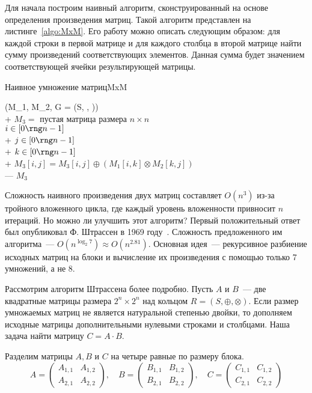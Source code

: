 Для начала построим наивный алгоритм, сконструированный на основе определения произведения матриц.
Такой алгоритм представлен на листинге~\ref{algo:MxM}.
Его работу можно описать следующим образом: для каждой строки в первой матрице и для каждого столбца в второй матрице найти сумму произведений соответствующих элементов.
Данная сумма будет значением соответствующей ячейки результирующей матрицы.

\begin{algorithm}{Наивное умножение матриц}{MxM}
    \begin{pseudo}[]
         (M_1, M_2, G = (S, \oplus, \otimes)) \\+
        $M_3 = $ пустая матрица размера $n \times n$ \\
         $i \in [0 \rng n - 1]$ \\+
         $j \in [0 \rng n - 1]$ \\+
         $k \in [0 \rng n - 1]$ \\+
        $M_3[i, j] = M_3[i, j] \oplus (M_1[i, k] \otimes M_2[k, j])$ \\---
         $M_3$
    \end{pseudo}
\end{algorithm}

Сложность наивного произведения двух матриц составляет $O(n^3)$ из-за тройного вложенного цикла, где каждый уровень вложенности привносит $n$ итераций.
Но можно ли улучшить этот алгоритм?
Первый положительный ответ был опубликовал Ф. Штрассен в 1969 году~.
Сложность предложенного им алгоритма~--- $O(n^{\log_2 7}) \approx O(n^{2.81})$.
Основная идея~--- рекурсивное разбиение исходных матриц на блоки и вычисление их произведения с помощью только 7 умножений, а не 8.

Рассмотрим алгоритм Штрассена более подробно.
Пусть $A$ и $B$~--- две квадратные матрицы размера $2^n \times 2^n$ над кольцом $R=(S, \oplus, \otimes)$.
Если размер умножаемых матриц не является натуральной степенью двойки, то дополняем исходные матрицы дополнительными нулевыми строками и столбцами.
Наша задача найти матрицу $C = A \cdot B$.

Разделим матрицы $A, B$ и $C$ на четыре равные по размеру блока.
\[
    A =
    \begin{pmatrix}
        A_{1,1} & A_{1,2} \\
        A_{2,1} & A_{2,2}
    \end{pmatrix},
    \quad
    B =
    \begin{pmatrix}
        B_{1,1} & B_{1,2} \\
        B_{2,1} & B_{2,2}
    \end{pmatrix},
    \quad
    C =
    \begin{pmatrix}
        C_{1,1} & C_{1,2} \\
        C_{2,1} & C_{2,2}
    \end{pmatrix}
\]

